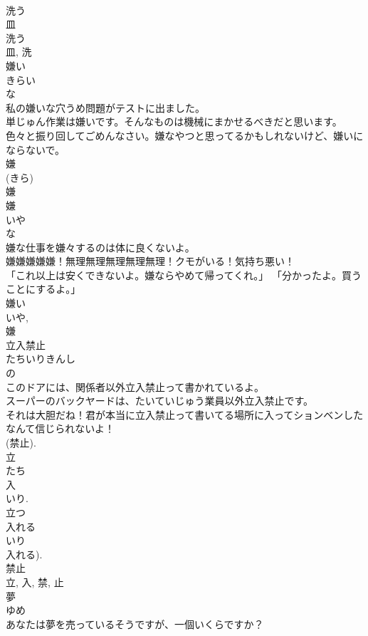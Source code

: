 \documentclass[8pt]{extreport}
\begin{document}
\begin{CJK}{UTF8}{min}
\\	洗う 
\\	皿 
\\	洗う 
\\	皿, 洗	
\\	嫌い	
\\	きらい	
\\	な 
\\	私の嫌いな穴うめ問題がテストに出ました。	
\\	単じゅん作業は嫌いです。そんなものは機械にまかせるべきだと思います。	
\\	色々と振り回してごめんなさい。嫌なやつと思ってるかもしれないけど、嫌いにならないで。	
\\	嫌 
\\	(きら) 
\\	嫌	
\\	嫌	
\\	いや	
\\	な 
\\	嫌な仕事を嫌々するのは体に良くないよ。	
\\	嫌嫌嫌嫌嫌！無理無理無理無理無理！クモがいる！気持ち悪い！	
\\	「これ以上は安くできないよ。嫌ならやめて帰ってくれ。」 「分かったよ。買うことにするよ。」	
\\	嫌い 
\\	いや, 
\\	嫌	
\\	立入禁止	
\\	たちいりきんし	
\\	の 
\\	このドアには、関係者以外立入禁止って書かれているよ。	
\\	スーパーのバックヤードは、たいていじゅう業員以外立入禁止です。	
\\	それは大胆だね！君が本当に立入禁止って書いてる場所に入ってションベンしたなんて信じられないよ！	
\\	(禁止). 
\\	立 
\\	たち 
\\	入 
\\	いり. 
\\	立つ 
\\	入れる 
\\	いり 
\\	入れる). 
\\	禁止 
\\	立, 入, 禁, 止	
\\	夢	
\\	ゆめ	
\\	あなたは夢を売っているそうですが、一個いくらですか？	

\end{CJK}
\end{document}
